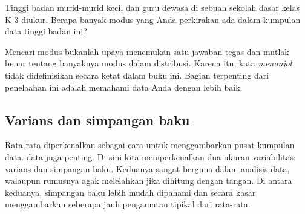 \begin{exercisewrap}
\begin{nexercise}
Tinggi badan murid-murid kecil dan guru dewasa di sebuah sekolah
dasar kelas K-3 diukur. Berapa banyak modus yang Anda perkirakan
ada dalam kumpulan data tinggi badan ini?\footnotemark{}
\end{nexercise}
\end{exercisewrap}

Mencari modus bukanlah upaya menemukan satu jawaban tegas dan
mutlak benar tentang banyaknya modus dalam distribusi. Karena itu,
kata \emph{menonjol} tidak didefinisikan secara
ketat dalam buku ini. Bagian terpenting dari penelaahan ini adalah
memahami data Anda dengan lebih baik.




\subsection{Varians dan simpangan baku}
\label{variability}

Rata-rata diperkenalkan sebagai cara untuk menggambarkan pusat
kumpulan data.  data juga
penting. Di sini kita memperkenalkan dua ukuran variabilitas:
varians dan simpangan baku.
Keduanya sangat berguna dalam analisis data, walaupun rumusnya
agak melelahkan jika dihitung dengan tangan.
Di antara keduanya, simpangan baku lebih mudah dipahami dan secara
kasar menggambarkan seberapa jauh pengamatan tipikal dari rata-rata.

